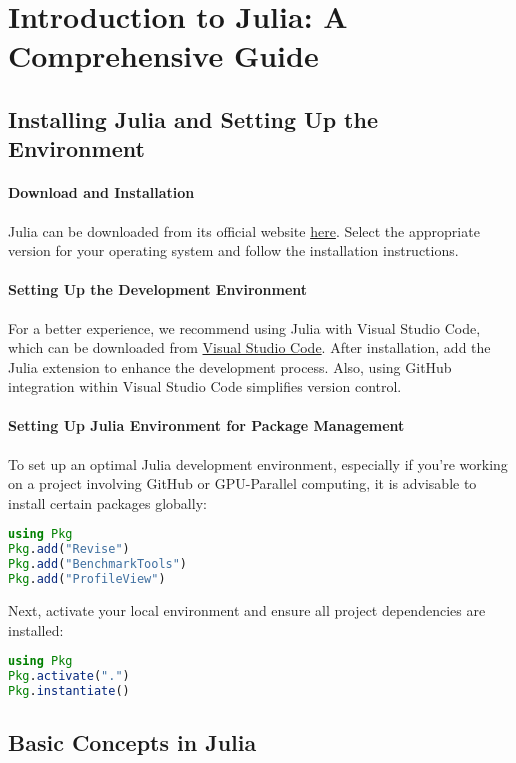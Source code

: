 \section{Introduction to Julia: A Comprehensive Guide}

\subsection{Installing Julia and Setting Up the Environment}

\paragraph{Download and Installation}
Julia can be downloaded from its official website \href{https://julialang.org/downloads/}{here}. Select the appropriate version for your operating system and follow the installation instructions.

\paragraph{Setting Up the Development Environment}
For a better experience, we recommend using Julia with Visual Studio Code, which can be downloaded from \href{https://code.visualstudio.com/}{Visual Studio Code}. After installation, add the Julia extension to enhance the development process. Also, using GitHub integration within Visual Studio Code simplifies version control.

\paragraph{Setting Up Julia Environment for Package Management}
To set up an optimal Julia development environment, especially if you're working on a project involving GitHub or GPU-Parallel computing, it is advisable to install certain packages globally:

\begin{lstlisting}[language=Julia]
using Pkg
Pkg.add("Revise")
Pkg.add("BenchmarkTools")
Pkg.add("ProfileView")
\end{lstlisting}

Next, activate your local environment and ensure all project dependencies are installed:

\begin{lstlisting}[language=Julia]
using Pkg
Pkg.activate(".")
Pkg.instantiate()
\end{lstlisting}

\subsection{Basic Concepts in Julia}

